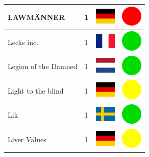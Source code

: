 \documentclass[12pt, a4paper, twoside]{report}
\begin{document}
\begin{center}
\begin{longtable}{|p{5cm}|p{2cm}|p{2cm}|p{2cm}|}
			LAWMÄNNER & 1 & \includegraphics[width=1cm]{4x3/de} & \includegraphics[width=1cm]{likes/n} \\ \hline
			Lecks inc. & 1 & \includegraphics[width=1cm]{4x3/fr} & \includegraphics[width=1cm]{likes/y} \\ \hline
			Legion of the Damned & 1 & \includegraphics[width=1cm]{4x3/nl} & \includegraphics[width=1cm]{likes/y} \\ \hline
			Light to the blind & 1 & \includegraphics[width=1cm]{4x3/de} & \includegraphics[width=1cm]{likes/m} \\ \hline
			Lik & 1 & \includegraphics[width=1cm]{4x3/se} & \includegraphics[width=1cm]{likes/y} \\ \hline
			Liver Values & 1 & \includegraphics[width=1cm]{4x3/de} & \includegraphics[width=1cm]{likes/m} \\ \hline

\end{longtable}
\end{center}
\end{document}
